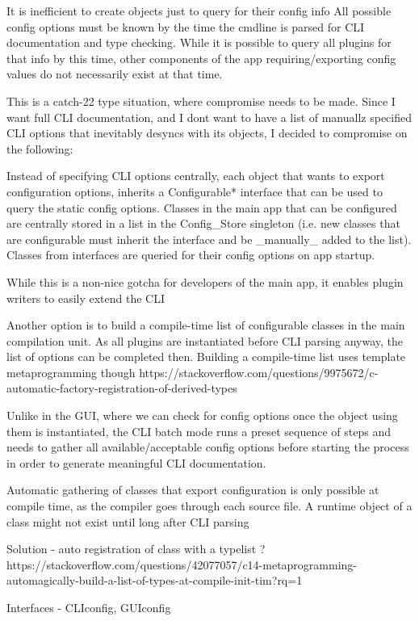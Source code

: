 It is inefficient to create objects just to query for their config info
All possible config options must be known by the time the cmdline is parsed for CLI documentation and type checking. While it is possible to query all plugins for that info by this time, other components of the app requiring/exporting config values do not necessarily exist at that time.

This is a catch-22 type situation, where compromise needs to be made. Since I want full CLI documentation, and I dont want to have a list of manuallz specified CLI options that inevitably desyncs with its objects, I decided to compromise on the following:

Instead of specifying CLI options centrally, each object that wants to export configuration options, inherits a Configurable* interface that can be used to query the static config options.
Classes in the main app that can be configured are centrally stored in a list in the Config_Store singleton (i.e. new classes that are configurable must inherit the interface and be _manually_ added to the list).
Classes from interfaces are queried for their config options on app startup.

While this is a non-nice gotcha for developers of the main app, it enables plugin writers to easily extend the CLI


Another option is to build a compile-time list of configurable classes in the main compilation unit. As all plugins are instantiated before CLI parsing anyway, the list of options can be completed then.
Building a compile-time list uses template metaprogramming though
	https://stackoverflow.com/questions/9975672/c-automatic-factory-registration-of-derived-types

Unlike in the GUI, where we can check for config options once the object using them is instantiated, the CLI batch mode runs a preset sequence of steps and needs to gather all available/acceptable config options before starting the process in order to generate meaningful CLI documentation.	

Automatic gathering of classes that export configuration is only possible at compile time, as the compiler goes through each source file. A runtime object of a class might not exist until long after CLI parsing	


Solution - auto registration of class with a typelist ?
https://stackoverflow.com/questions/42077057/c14-metaprogramming-automagically-build-a-list-of-types-at-compile-init-tim?rq=1

Interfaces - CLIconfig, GUIconfig

